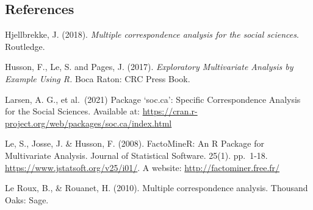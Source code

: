 \documentclass[
  letterpaper,
  DIV=11,
  numbers=noendperiod]{scrartcl}
\begin{document}
\subsection{References}\label{references}

Hjellbrekke, J. (2018). \emph{Multiple correspondence analysis for the
social sciences}. Routledge.

Husson, F., Le, S. and Pages, J. (2017). \emph{Exploratory Multivariate
Analysis by Example Using R.} Boca Raton: CRC Press Book.

Larsen, A. G., et al.~(2021) Package `soc.ca': Specific Correspondence
Analysis for the Social Sciences. Available at:
\url{https://cran.r-project.org/web/packages/soc.ca/index.html}

Le, S., Josse, J. \& Husson, F. (2008). FactoMineR: An R Package for
Multivariate Analysis. Journal of Statistical Software. 25(1). pp.~1-18.
\url{https://www.jstatsoft.org/v25/i01/}. A website:
\url{http://factominer.free.fr/}

Le Roux, B., \& Rouanet, H. (2010). Multiple correspondence analysis.
Thousand Oaks: Sage.
\end{document}
